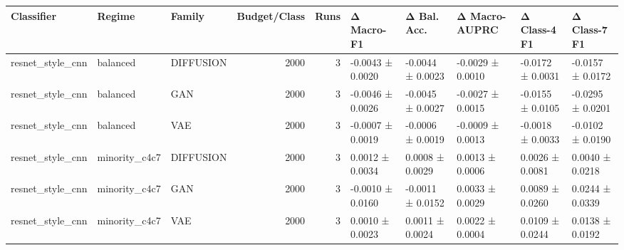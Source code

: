 \begin{tabular}{lllrrlllll}
\toprule
Classifier & Regime & Family & Budget/Class & Runs & Δ Macro-F1 & Δ Bal. Acc. & Δ Macro-AUPRC & Δ Class-4 F1 & Δ Class-7 F1 \\
\midrule
resnet_style_cnn & balanced & DIFFUSION & 2000 & 3 & -0.0043 ± 0.0020 & -0.0044 ± 0.0023 & -0.0029 ± 0.0010 & -0.0172 ± 0.0031 & -0.0157 ± 0.0172 \\
resnet_style_cnn & balanced & GAN & 2000 & 3 & -0.0046 ± 0.0026 & -0.0045 ± 0.0027 & -0.0027 ± 0.0015 & -0.0155 ± 0.0105 & -0.0295 ± 0.0201 \\
resnet_style_cnn & balanced & VAE & 2000 & 3 & -0.0007 ± 0.0019 & -0.0006 ± 0.0019 & -0.0009 ± 0.0013 & -0.0018 ± 0.0033 & -0.0102 ± 0.0190 \\
resnet_style_cnn & minority_c4c7 & DIFFUSION & 2000 & 3 & 0.0012 ± 0.0034 & 0.0008 ± 0.0029 & 0.0013 ± 0.0006 & 0.0026 ± 0.0081 & 0.0040 ± 0.0218 \\
resnet_style_cnn & minority_c4c7 & GAN & 2000 & 3 & -0.0010 ± 0.0160 & -0.0011 ± 0.0152 & 0.0033 ± 0.0029 & 0.0089 ± 0.0260 & 0.0244 ± 0.0339 \\
resnet_style_cnn & minority_c4c7 & VAE & 2000 & 3 & 0.0010 ± 0.0023 & 0.0011 ± 0.0024 & 0.0022 ± 0.0004 & 0.0109 ± 0.0244 & 0.0138 ± 0.0192 \\
\bottomrule
\end{tabular}
